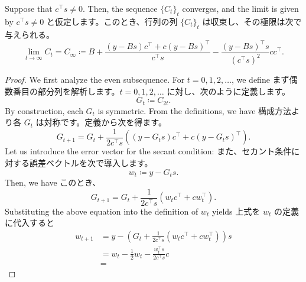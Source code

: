 \documentclass[0_main]{subfiles}
\begin{document}
\begin{proposition}\label{prop:psb-convergence}
    \ifEn
        Suppose that $c^\top s \neq 0$. Then, the sequence $\{ C_t \}_t$ converges, and the limit is given by
    \else
        $c^\top s \neq 0$ と仮定します。このとき、行列の列 $\{ C_t \}_t$ は収束し、その極限は次で与えられる。
    \fi
    \begin{equation*}
        \lim_{t \to \infty} C_{t}
        =
        C_{\infty}
        \coloneqq
        B + \frac{(y - Bs)c^\top + c(y - Bs)^\top}{c^\top s} - \frac{(y - Bs)^\top s}{(c^\top s)^2} c c^\top.
    \end{equation*}
\end{proposition}
\begin{proof}
    \ifEn
        We first analyze the even subsequence. For $t=0,1,2,\dots$, we define
    \else
        まず偶数番目の部分列を解析します。$t=0,1,2,\dots$ に対し、次のように定義します。
    \fi
    \begin{equation*}
        G_t \coloneqq C_{2t}.
    \end{equation*}
    \ifEn
        By construction, each $G_t$ is symmetric. From the definitions, we have
    \else
        構成方法より各 $G_t$ は対称です。定義から次を得ます。
    \fi
    \begin{equation*}
        G_{t+1} = G_t +\frac{1}{2c^\top s}\left((y-G_t s)c^\top+c(y-G_t s)^\top\right).
    \end{equation*}
    \ifEn
        Let us introduce the error vector for the secant condition:
    \else
        また、セカント条件に対する誤差ベクトルを次で導入します。
    \fi
    \begin{equation*}
        w_t \coloneqq y-G_t s.
    \end{equation*}
    \ifEn
        Then, we have
    \else
        このとき、
    \fi
    \begin{equation*}
        G_{t+1} = G_t+\frac{1}{2c^\top s}(w_t c^\top+cw_t^\top).
    \end{equation*}
    \ifEn
        Substituting the above equation into the definition of $w_t$ yields
    \else
        上式を $w_t$ の定義に代入すると
    \fi
    \begin{align*}
        w_{t+1} & = y-\left(G_t+\frac{1}{2c^\top s}(w_t c^\top+cw_t^\top)\right)s \\
                & =
        w_t-\frac12w_t-\frac{w_t^\top s}{2c^\top s}c                              \\
                & =

\end{align*}
\end{proof}
\end{document}
